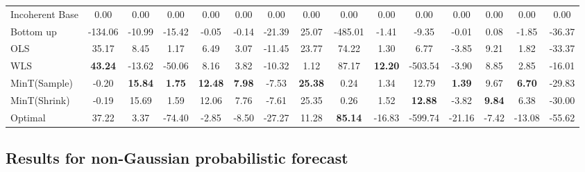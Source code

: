 \documentclass[12pt]{article}
\theoremstyle{definition}
\begin{document}
\begin{table}[H]
{\begin{tabular}{lcccccccccccccc}
			Incoherent Base & 0.00 & 0.00 & 0.00 & 0.00 & 0.00 & 0.00 & 0.00 & 0.00 & 0.00 & 0.00 & 0.00 & 0.00 & 0.00 & 0.00\\
			Bottom up & -134.06 & -10.99 & -15.42 & -0.05 & -0.14 & -21.39 & 25.07 & -485.01 & -1.41 & -9.35 & -0.01 & 0.08 & -1.85 & -36.37\\
			OLS & 35.17 & 8.45 & 1.17 & 6.49 & 3.07 & -11.45 & 23.77 & 74.22 & 1.30 & 6.77 & -3.85 & 9.21 & 1.82 & -33.37\\
			WLS & \textbf{43.24} & -13.62 & -50.06 & 8.16 & 3.82 & -10.32 & 1.12 & 87.17 & \textbf{12.20} & -503.54 & -3.90 & 8.85 & 2.85 & -16.01\\
			MinT(Sample) & -0.20 & \textbf{15.84} & \textbf{1.75} & \textbf{12.48} & \textbf{7.98} & -7.53 & \textbf{25.38} & 0.24 & 1.34 & 12.79 & \textbf{1.39} & 9.67 & \textbf{6.70} & -29.83\\
			MinT(Shrink) & -0.19 & 15.69 & 1.59 & 12.06 & 7.76 & -7.61 & 25.35 & 0.26 & 1.52 & \textbf{12.88} & -3.82 & \textbf{9.84}& 6.38 & -30.00\\
			Optimal & 37.22 & 3.37 & -74.40 & -2.85 & -8.50 & -27.27 & 11.28 & \textbf{85.14} & -16.83 & -599.74 & -21.16 & -7.42 & -13.08 & -55.62\\
			\bottomrule
		\end{tabular}
	}
\end{table}

\subsection{Results for non-Gaussian probabilistic forecast} \label{sec:SimSamplingResults}




\end{document}
